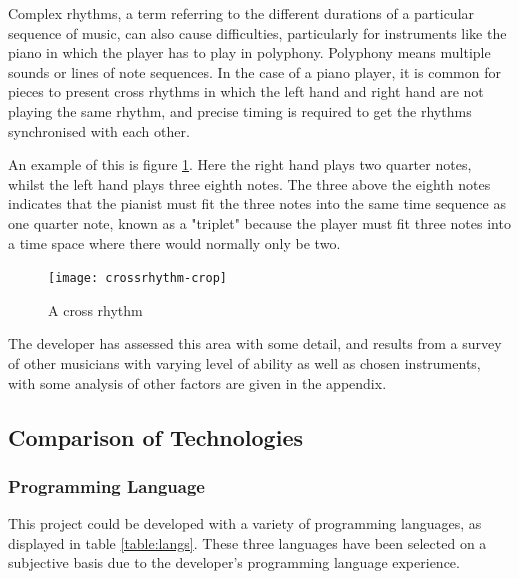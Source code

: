 Complex rhythms, a term referring to the different durations of a particular sequence of music, can also cause difficulties, particularly for instruments like the piano in which the player has to play in polyphony. Polyphony means multiple sounds or lines of note sequences. In the case of a piano player, it is common for pieces to present cross rhythms in which the left hand and right hand are not playing the same rhythm, and precise timing is required to get the rhythms synchronised with each other. 

An example of this is figure \ref{fig:crossrhythms}. Here the right hand plays two quarter notes, whilst the left hand plays three eighth notes. The three above the eighth notes indicates that the pianist must fit the three notes into the same time sequence as one quarter note, known as a "triplet" because the player must fit three notes into a time space where there would normally only be two.

\begin{figure}[H]
\centering
\texttt{[image: crossrhythm-crop]}
\caption{A cross rhythm}
\label{fig:crossrhythms}	
\end{figure}

The developer has assessed this area with some detail, and results from a survey of other musicians with varying level of ability as well as chosen instruments, with some analysis of other factors are given in the appendix.

\subsection{Comparison of Technologies}
\subsubsection{Programming Language}
This project could be developed with a variety of programming languages, as displayed in table \ref{table:langs}. These three languages have been selected on a subjective basis due to the developer's programming language experience.

